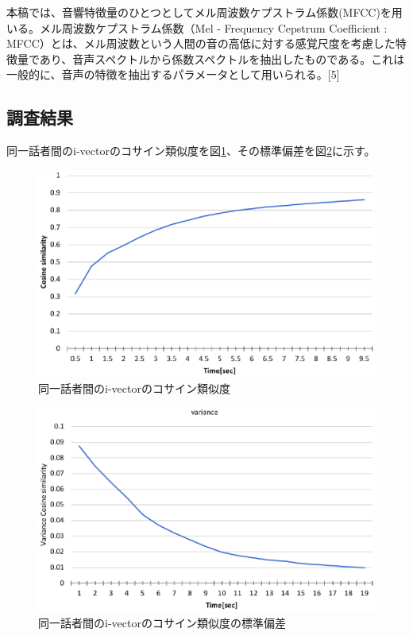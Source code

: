 本稿では、音響特徴量のひとつとしてメル周波数ケプストラム係数(MFCC)を用いる。メル周波数ケプストラム係数（Mel - Frequency Cepstrum Coefficient : MFCC）とは、メル周波数という人間の音の高低に対する感覚尺度を考慮した特徴量であり、音声スペクトルから係数スペクトルを抽出したものである。これは一般的に、音声の特徴を抽出するパラメータとして用いられる。[5]

\subsection{調査結果}
\par
同一話者間のi-vectorのコサイン類似度を図\ref{fig:same_cos_hist}、その標準偏差を図\ref{fig:same_cos_vari}に示す。\par

\begin{figure}[H]
  \begin{center}
    \includegraphics[scale=0.8]{./figure/same_cos_hist.eps}
  \end{center}
  \caption{同一話者間のi-vectorのコサイン類似度 \label{fig:same_cos_hist}}
\end{figure}

\begin{figure}[H]
  \begin{center}
    \includegraphics[scale=0.8]{./figure/same_cos_vari.eps}
  \end{center}
  \caption{同一話者間のi-vectorのコサイン類似度の標準偏差 \label{fig:same_cos_vari}}
\end{figure}

